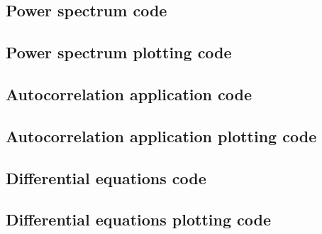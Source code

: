 \documentclass[twocolumn]{myarticle}
\begin{document}
\subsection{Power spectrum code}
\label{subsec:power_spectrum_code}


\vspace{10pt}

\subsection{Power spectrum plotting code}
\label{subsec:power_spectrum_plotting_code}


\vspace{10pt}

\subsection{Autocorrelation application code}
\label{subsec:autocorrelation_application_code}


\vspace{10pt}

\subsection{Autocorrelation application plotting code}
\label{subsec:autocorrelation_application_plotting_code}


\vspace{10pt}

\subsection{Differential equations code}
\label{subsec:differential_equations_code}


\vspace{10pt}

\subsection{Differential equations plotting code}
\label{subsec:differential_equations_plotting_code}


\vspace{10pt}
\end{document}
